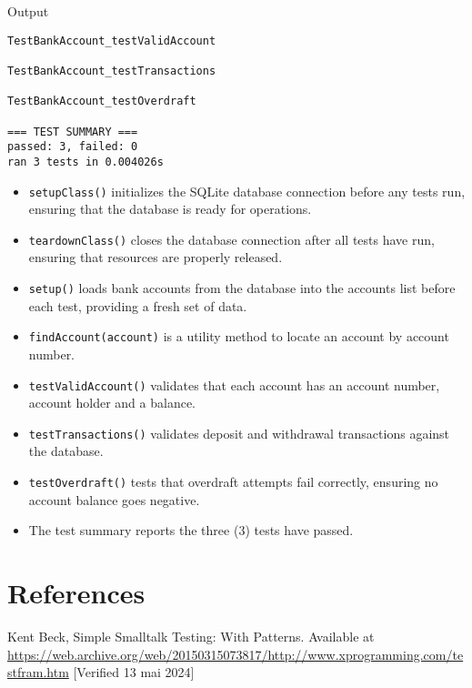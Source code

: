 \documentclass[letterpaper,12pt]{article}
\begin{document}
\noindent Output
\begin{verbatim}
TestBankAccount_testValidAccount

TestBankAccount_testTransactions

TestBankAccount_testOverdraft

=== TEST SUMMARY ===
passed: 3, failed: 0
ran 3 tests in 0.004026s
\end{verbatim}

\newpage{}
\begin{itemize}
   \item \texttt{setupClass()} initializes the SQLite database connection before any tests run, ensuring that the database is ready for operations.
   \item \texttt{teardownClass()} closes the database connection after all tests have run, ensuring that resources are properly released.
   \item \texttt{setup()} loads bank accounts from the database into the accounts list before each test, providing a fresh set of data.
   \item \texttt{findAccount(account)} is a utility method to locate an account by account number.
   \item \texttt{testValidAccount()} validates that each account has an account number, account holder and a balance.
   \item \texttt{testTransactions()} validates deposit and withdrawal transactions against the database.
   \item \texttt{testOverdraft()} tests that overdraft attempts fail correctly, ensuring no account balance goes negative.
   \item The test summary reports the three (3) tests have passed.
\end{itemize}


\section*{References}

\noindent
[1] Kent Beck, Simple Smalltalk Testing: With Patterns. Available at \url{https://web.archive.org/web/20150315073817/http://www.xprogramming.com/testfram.htm} [Verified 13 mai 2024]
\end{document}
